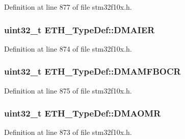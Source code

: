 Definition at line 877 of file stm32f10x.\+h.

\subsubsection[{\texorpdfstring{D\+M\+A\+I\+ER}{DMAIER}}]{ {\bf uint32\+\_\+t} E\+T\+H\+\_\+\+Type\+Def\+::\+D\+M\+A\+I\+ER}\hypertarget{struct_e_t_h___type_def_af35764e78c9cb2a8743822f63134ef42}{}\label{struct_e_t_h___type_def_af35764e78c9cb2a8743822f63134ef42}


Definition at line 874 of file stm32f10x.\+h.

\subsubsection[{\texorpdfstring{D\+M\+A\+M\+F\+B\+O\+CR}{DMAMFBOCR}}]{ {\bf uint32\+\_\+t} E\+T\+H\+\_\+\+Type\+Def\+::\+D\+M\+A\+M\+F\+B\+O\+CR}\hypertarget{struct_e_t_h___type_def_aa031754e61b60bbbec393be19fb30036}{}\label{struct_e_t_h___type_def_aa031754e61b60bbbec393be19fb30036}


Definition at line 875 of file stm32f10x.\+h.

\subsubsection[{\texorpdfstring{D\+M\+A\+O\+MR}{DMAOMR}}]{ {\bf uint32\+\_\+t} E\+T\+H\+\_\+\+Type\+Def\+::\+D\+M\+A\+O\+MR}\hypertarget{struct_e_t_h___type_def_a28b3943a7ad7db88c59a5f690446eacd}{}\label{struct_e_t_h___type_def_a28b3943a7ad7db88c59a5f690446eacd}


Definition at line 873 of file stm32f10x.\+h.

